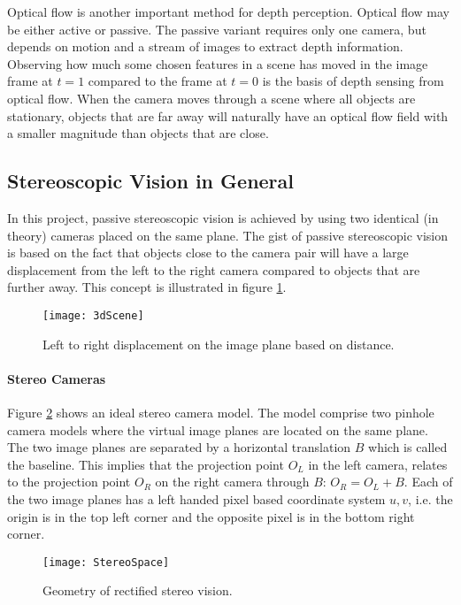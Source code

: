 Optical flow is another important method for depth perception. Optical flow may be either active or passive. The passive variant requires  only one camera, but depends on motion and a stream of images to extract depth information.\cite{optflwdepth} \cite{optflwego} Observing how much some chosen features in a scene has moved in the image frame at $t = 1$ compared to the frame at $t = 0$ is the basis of depth sensing from optical flow. When the camera moves through a scene where all objects are stationary, objects that are far away will naturally have an optical flow field with a smaller magnitude than objects that are close. 

\subsection{Stereoscopic Vision in General}

In this project, passive stereoscopic vision is achieved by using two identical (in theory) cameras placed on the same plane. The gist of passive stereoscopic vision is based on the fact that objects close to the camera pair will have a large displacement from the left to the right camera compared to objects that are further away. This concept is illustrated in figure \ref{fig:3dScene}.

\begin{figure}
\centering
\texttt{[image: 3dScene]}
\caption{\label{fig:3dScene}Left to right displacement on the image plane based on distance.}
\end{figure} 

\paragraph{Stereo Cameras}

Figure \ref{fig:StereoSpace} shows an ideal stereo camera model.  The model comprise two pinhole camera models where the virtual image planes are located on the same plane. The two image planes are separated by a horizontal translation $B$ which is called the baseline. This implies that the projection point $O_L$  in the left camera, relates to the projection point $O_R$ on the right camera through $B$: $O_R = O_L + B$. Each of the two image planes has a left handed pixel based coordinate system $u,v$, i.e. the origin is in the top left corner and the opposite pixel is in the bottom right corner. 

\begin{figure}
\centering
\texttt{[image: StereoSpace]}
\caption{\label{fig:StereoSpace}Geometry of rectified stereo vision.}
\end{figure}

